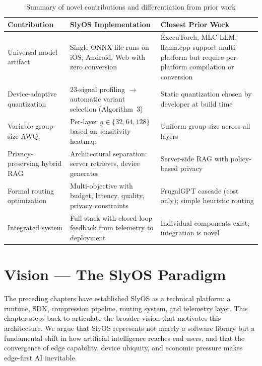 \documentclass[12pt, letterpaper, twoside]{report}
\begin{document}
\begin{table}[H]
\centering
\caption{Summary of novel contributions and differentiation from prior work}
\label{tab:novelty_summary}
{\small
\begin{tabularx}{\textwidth}{@{}lXX@{}}
\toprule
\textbf{Contribution} & \textbf{SlyOS Implementation} & \textbf{Closest Prior Work} \\
\midrule
Universal model artifact & Single ONNX file runs on iOS, Android, Web with zero conversion & ExecuTorch, MLC-LLM, llama.cpp support multi-platform but require per-platform compilation or conversion \\
\addlinespace
Device-adaptive quantization & 23-signal profiling $\to$ automatic variant selection (Algorithm~3) & Static quantization chosen by developer at build time \\
\addlinespace
Variable group-size AWQ & Per-layer $g \in \{32, 64, 128\}$ based on sensitivity heatmap & Uniform group size across all layers \\
\addlinespace
Privacy-preserving hybrid RAG & Architectural separation: server retrieves, device generates & Server-side RAG with policy-based privacy \\
\addlinespace
Formal routing optimization & Multi-objective with budget, latency, quality, privacy constraints & FrugalGPT cascade (cost only); simple heuristic routing \\
\addlinespace
Integrated system & Full stack with closed-loop feedback from telemetry to deployment & Individual components exist; integration is novel \\
\bottomrule
\end{tabularx}
}
\end{table}

\chapter{Vision --- The SlyOS Paradigm}
\label{ch:vision}

The preceding chapters have established SlyOS as a technical platform: a runtime, SDK, compression pipeline, routing system, and telemetry layer. This chapter steps back to articulate the broader vision that motivates this architecture. We argue that SlyOS represents not merely a software library but a fundamental shift in how artificial intelligence reaches end users, and that the convergence of edge capability, device ubiquity, and economic pressure makes edge-first AI inevitable.
\end{document}
